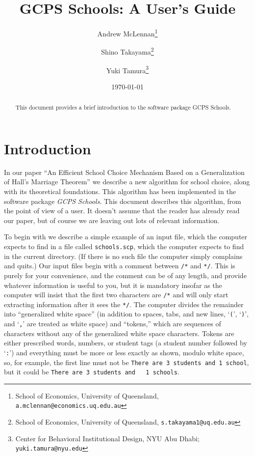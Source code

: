 \documentclass[12pt]{article}
\theoremstyle{definition}
\begin{document}
\title{GCPS Schools: A User's Guide}

\author{Andrew McLennan\footnote{School of Economics, University of
    Queensland, {\tt a.mclennan@economics.uq.edu.au}} \and  Shino
Takayama\footnote{School of Economics, University of
  Queensland, {\tt s.takayama1@uq.edu.au}} \and Yuki Tamura\footnote{Center for Behavioral Institutional Design, NYU Abu Dhabi; {\tt yuki.tamura@nyu.edu}}}

\date{\today}

\maketitle

\begin{abstract}
This document provides a brief introduction to the software package GCPS Schools.
\end{abstract}


\section{Introduction}

In our paper ``An Efficient School Choice Mechanism Based on a
Generalization of Hall's Marriage Theorem'' we describe a new
algorithm for school choice, along with its theoretical foundations.
This algorithm has been implemented in the software package \emph{GCPS
  Schools}.  This document describes this algorithm, from the point of
view of a user.  It doesn't assume that the reader has already read
our paper, but of course we are leaving out lots of relevant
information.

To begin with we describe a simple example of an input file, which the
computer expects to find in a file called \texttt{schools.scp}, which
the computer expects to find in the current directory.  (If there is
no such file the computer simply complains and quits.)  Our input
files begin with a comment between \texttt{/*} and \texttt{*/}.  This
is purely for your convenience, and the comment can be of any length,
and provide whatever information is useful to you, but it is mandatory
insofar as the computer will insist that the first two characters are
\texttt{/*} and will only start extracting information after it sees
the \texttt{*/}.  The computer divides the remainder into
``generalized white space'' (in addition to spaces, tabs, and new
lines, `\texttt{(}', `\texttt{)}', and `\texttt{,}' are treated as
white space) and ``tokens,'' which are sequences of characters without
any of the generalized white space characters.  Tokens are either
prescribed words, numbers, or student tags (a student number followed
by `\texttt{:}') and everything must be more or less exactly as shown,
modulo white space, so, for example, the first line must not be
\texttt{There are 3 students and 1 school}, but it could be
\texttt{There are 3 students and \ \ 1 schools}.
\end{document}
